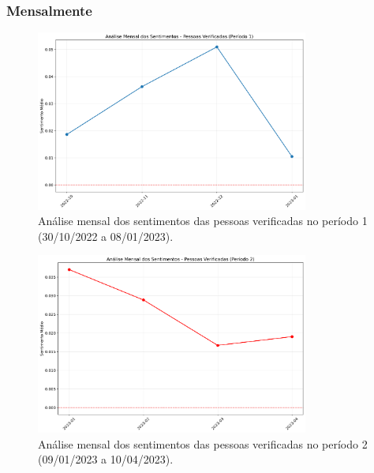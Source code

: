 \documentclass[manuscript,screen,review]{acmart}
\begin{document}
\subsubsection{Mensalmente}

\begin{figure}[h]
\centering
\includegraphics[width=0.8\textwidth]{figura5_sentimentos_verificadas_mensal_periodo1.png}
\caption{Análise mensal dos sentimentos das pessoas verificadas no período 1 (30/10/2022 a 08/01/2023).}
\label{fig:figura5}
\end{figure}

\begin{figure}[h]
\centering
\includegraphics[width=0.8\textwidth]{figura6_sentimentos_verificadas_mensal_periodo2.png}
\caption{Análise mensal dos sentimentos das pessoas verificadas no período 2 (09/01/2023 a 10/04/2023).}
\label{fig:figura6}
\end{figure}
\end{document}
